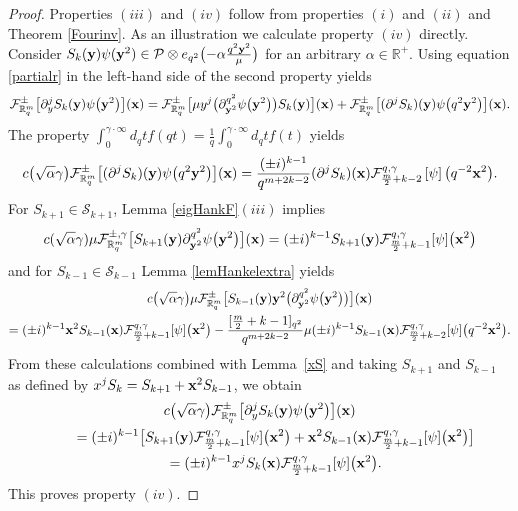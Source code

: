 \documentclass[pdftex]{sigma}
\newcommand{\mR}{\mathbb{R}}
\newcommand{\cF}{\mathcal{F}}
\newcommand{\cP}{\mathcal{P}}
\newcommand{\cS}{\mathcal{S}}
\numberwithin{equation}{section}
\begin{document}
\begin{proof}
Properties $(iii)$ and $(iv)$ follow from properties $(i)$ and $(ii)$ and Theorem \ref{Fourinv}. As an illustration we calculate property $(iv)$ directly. Consider $S_k(\bold{y})\psi(\bold{y}^2)\in\cP\otimes e_{q^2}\big({-}\alpha\frac{q^2\bold{y}^2}{\mu}\big)$ for an arbitrary $\alpha\in\mR^+$. Using equation \eqref{partialr} in the left-hand side of the second property yields
\begin{gather*}
\cF^{\pm}_{\mR^m_q}\big[\partial^j_yS_k(\bold{y})\psi\big(\bold{y}^2\big)\big](\bold{x}) =  \cF^{\pm}_{\mR^m_q}\big[\mu y^j\big(\partial^{q^2}_{\bold{y}^2}\psi\big(\bold{y}^2\big)\big)S_k(\bold{y})\big](\bold{x})+ \cF^{\pm}_{\mR^m_q}\big[(\partial^jS_k)(\bold{y})\psi\big(q^2\bold{y}^2\big)\big](\bold{x}).
\end{gather*}
The property $\int_0^{\gamma\cdot\infty}d_qt f(qt)=\frac{1}{q}\int_0^{\gamma\cdot\infty}d_qt f(t)$ yields
\begin{gather*}
c\big(\sqrt{\alpha}\gamma\big)\cF^{\pm}_{\mR^m_q}\big[(\partial^jS_k)(\bold{y})\psi\big(q^2\bold{y}^2\big)\big](\bold{x}) = \frac{(\pm i)^{k-1}}{q^{m+2k-2}}(\partial^jS_k)(\bold{x})\cF^{q,\gamma}_{\frac{m}{2}+k-2}\left[\psi\right]\big(q^{-2}\bold{x}^2\big).
\end{gather*}
For $S_{k+1}\in\cS_{k+1}$, Lemma \ref{eigHankF}$(iii)$ implies
\begin{gather*}
c(\sqrt{\alpha}\gamma)\mu\cF^{\pm,\gamma}_{\mR^m_q}\big[ S_{k+1}(\bold{y})\partial^{q^2}_{\bold{y}^2}\psi\big(\bold{y}^2\big)\big](\bold{x}) = (\pm i)^{k-1}S_{k+1}(\bold{y})\cF^{q,\gamma}_{\frac{m}{2}+k-1}[\psi]\big(\bold{x}^2\big)
\end{gather*}
and for $S_{k-1}\in\cS_{k-1}$ Lemma \ref{lemHankelextra} yields
\begin{gather*}
c\big(\sqrt{\alpha}\gamma\big)\mu \cF^{\pm}_{\mR^m_q}\big[ S_{k-1}(\bold{y})\bold{y}^2\big(\partial^{q^2}_{\bold{y}^2}\psi\big(\bold{y}^2\big)\big)\big](\bold{x}) \\
= (\pm i)^{k-1}\bold{x}^2S_{k-1}(\bold{x})\cF^{q,\gamma}_{\frac{m}{2}+k-1}[\psi]\big(\bold{x}^2\big)
 - \frac{[\frac{m}{2}+k-1]_{q^2}}{q^{{m}+2k-2}}\mu(\pm i)^{k-1}S_{k-1}(\bold{x})\cF^{q,\gamma}_{\frac{m}{2}+k-2}[\psi]\big(q^{-2}\bold{x}^2\big).
\end{gather*}
From these calculations combined with Lemma~\ref{xS} and taking $S_{k+1}$ and $S_{k-1}$ as def\/ined by $x^jS_k=S_{k+1}+\bold{x}^2S_{k-1}$, we obtain
\begin{gather*}
c\big(\sqrt{\alpha}\gamma\big)\cF^{\pm}_{\mR^m_q}\big[\partial^j_yS_k(\bold{y})\psi\big(\bold{y}^2\big)\big](\bold{x})\\
\qquad{} = (\pm i)^{k-1}\big[S_{k+1}(\bold{y})\cF^{q,\gamma}_{\frac{m}{2}+k-1}[\psi]\big(\bold{x}^2\big)
+\bold{x}^2S_{k-1}(\bold{x})\cF^{q,\gamma}_{\frac{m}{2}+k-1}[\psi]\big(\bold{x}^2\big)\big]\\
\qquad{} = (\pm i)^{k-1}x^jS_{k}(\bold{x})\cF_{\frac{m}{2}+k-1}^{q,\gamma}[\psi]\big(\bold{x}^2\big).
\end{gather*}
This proves property $(iv)$.
\end{proof}
\end{document}
